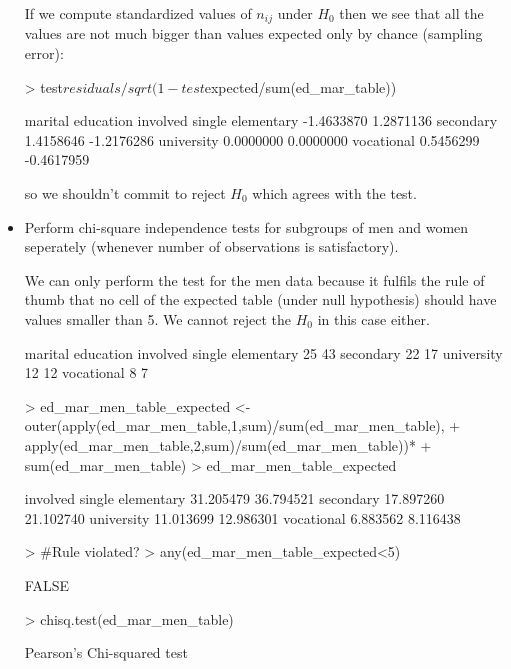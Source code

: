 \documentclass[a4paper]{article}
\begin{document}
\begin{itemize}
If we compute standardized values of $n_{ij}$ under $H_0$ then we see that all the values are not much bigger than values expected only by chance (sampling error): 
\begin{Schunk}
\begin{Sinput}
> test$residuals/sqrt(1-test$expected/sum(ed_mar_table))
\end{Sinput}
\begin{Soutput}
            marital
education      involved     single
  elementary -1.4633870  1.2871136
  secondary   1.4158646 -1.2176286
  university  0.0000000  0.0000000
  vocational  0.5456299 -0.4617959
\end{Soutput}
\end{Schunk}
so we shouldn't commit to reject $H_0$ which agrees with the test.
\item Perform chi-square independence tests for subgroups of men and women seperately (whenever number of observations is satisfactory).

We can only perform the test for the men data because it fulfils the rule of thumb that no cell of the expected table (under null hypothesis) should have values smaller than 5. We cannot reject
the $H_0$ in this case either.
\begin{Schunk}
\begin{Soutput}
            marital
education    involved single
  elementary       25     43
  secondary        22     17
  university       12     12
  vocational        8      7
\end{Soutput}
\begin{Sinput}
> ed_mar_men_table_expected <- outer(apply(ed_mar_men_table,1,sum)/sum(ed_mar_men_table),
+                                    apply(ed_mar_men_table,2,sum)/sum(ed_mar_men_table))*
+   sum(ed_mar_men_table)
> ed_mar_men_table_expected
\end{Sinput}
\begin{Soutput}
            involved    single
elementary 31.205479 36.794521
secondary  17.897260 21.102740
university 11.013699 12.986301
vocational  6.883562  8.116438
\end{Soutput}
\begin{Sinput}
> #Rule violated?
> any(ed_mar_men_table_expected<5)
\end{Sinput}
\begin{Soutput}
[1] FALSE
\end{Soutput}
\begin{Sinput}
> chisq.test(ed_mar_men_table)
\end{Sinput}
\begin{Soutput}
	Pearson's Chi-squared test


\end{Soutput}
\end{Schunk}
\end{itemize}
\end{document}
